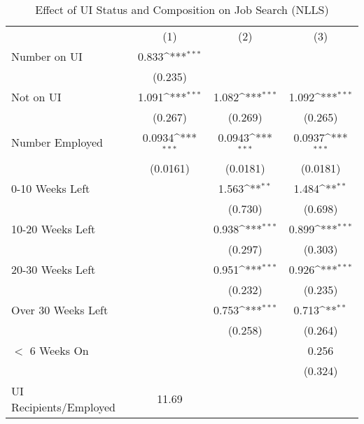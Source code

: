 \begin{table}[htbp]\centering
\def\sym#1{\ifmmode^{#1}\else\(^{#1}\)\fi}
\caption{Effect of UI Status and Composition on Job Search (NLLS)}
\begin{tabular}{l*{3}{c}}
\hline\hline
                    &\multicolumn{1}{c}{(1)}         &\multicolumn{1}{c}{(2)}         &\multicolumn{1}{c}{(3)}         \\
Number on UI        &       0.833\sym{***}&                     &                     \\
                    &     (0.235)         &                     &                     \\
Not on UI           &       1.091\sym{***}&       1.082\sym{***}&       1.092\sym{***}\\
                    &     (0.267)         &     (0.269)         &     (0.265)         \\
Number Employed     &      0.0934\sym{***}&      0.0943\sym{***}&      0.0937\sym{***}\\
                    &    (0.0161)         &    (0.0181)         &    (0.0181)         \\
0-10 Weeks Left     &                     &       1.563\sym{**} &       1.484\sym{**} \\
                    &                     &     (0.730)         &     (0.698)         \\
10-20 Weeks Left    &                     &       0.938\sym{***}&       0.899\sym{***}\\
                    &                     &     (0.297)         &     (0.303)         \\
20-30 Weeks Left    &                     &       0.951\sym{***}&       0.926\sym{***}\\
                    &                     &     (0.232)         &     (0.235)         \\
Over 30 Weeks Left  &                     &       0.753\sym{***}&       0.713\sym{**} \\
                    &                     &     (0.258)         &     (0.264)         \\
$<$ 6 Weeks On      &                     &                     &       0.256         \\
                    &                     &                     &     (0.324)         \\
\hline
UI Recipients/Employed&       11.69         &                     &                     \\

\end{tabular}
\end{table}
